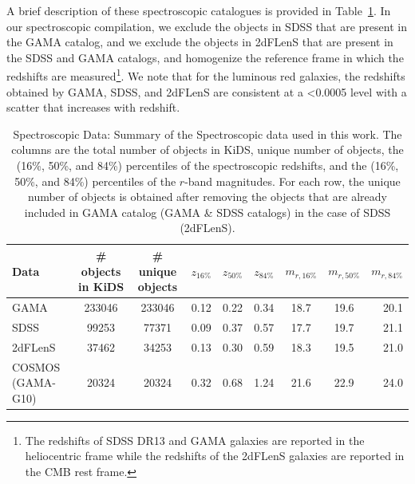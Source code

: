 \documentclass{aa}
\numberwithin{equation}{section}
\begin{document}
{A brief description of these spectroscopic catalogues is provided in Table~\ref{tab:zspec}. In our spectroscopic compilation, we exclude the objects in SDSS that are present in the GAMA catalog, and we exclude the objects in 2dFLenS that are present in the SDSS and GAMA catalogs, and homogenize the reference frame in which the redshifts are measured\footnote{The redshifts of SDSS DR13 and GAMA galaxies are reported in the heliocentric frame while the redshifts of the 2dFLenS galaxies are reported in the CMB rest frame.}. We note that for the luminous red galaxies, the redshifts obtained by GAMA, SDSS, and 2dFLenS are consistent at a <0.0005 level with a scatter that increases with redshift. 


\begin{table}
	\centering
	\caption{{ Spectroscopic Data: Summary of the Spectroscopic data used in this work. The columns are the total number of objects in KiDS, unique number of objects, the (16\%, 50\%, and 84\%) percentiles of the spectroscopic redshifts, and the (16\%, 50\%, and 84\%) percentiles of the $r$-band magnitudes. For each row, the unique number of objects is obtained after removing the objects that are already included in GAMA catalog (GAMA \& SDSS catalogs) in the case of SDSS (2dFLenS).} 
    }
	\label{tab:zspec}
	\begin{tabularx}{1.95\columnwidth}{lcccccccr} %
		\hline
		Data &  \# objects in KiDS & \# unique objects & $z_{16\%}$ & $z_{50\%}$ & $z_{84\%}$ & $m_{r, 16\%}$ & $m_{r, 50\%}$ & $m_{r, 84\%}$\\
		\hline
		GAMA     & 233046 & 233046 & 0.12  & 0.22 & 0.34 & 18.7 & 19.6 & 20.1  \\
		SDSS     & 99253 &  77371  & 0.09  & 0.37 & 0.57 & 17.7 & 19.7 & 21.1  \\
        2dFLenS  & 37462 &  34253  & 0.13  & 0.30 & 0.59 & 18.3 & 19.5 & 21.0  \\
        COSMOS (GAMA-G10)   & 20324 &  20324  & 0.32 & 0.68 & 1.24 & 21.6 & 22.9 & 24.0 \\
		\hline
	\end{tabularx}
\end{table}




}
\end{document}
